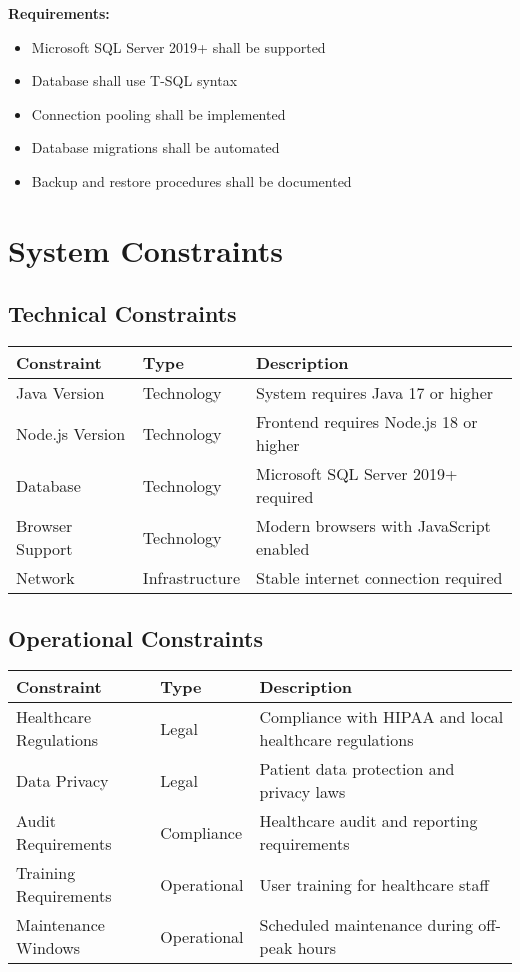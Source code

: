 \documentclass[12pt,a4paper]{article}
\begin{document}
\textbf{Requirements:}
\begin{itemize}
    \item Microsoft SQL Server 2019+ shall be supported
    \item Database shall use T-SQL syntax
    \item Connection pooling shall be implemented
    \item Database migrations shall be automated
    \item Backup and restore procedures shall be documented
\end{itemize}

\section{System Constraints}

\subsection{Technical Constraints}

\begin{longtable}{|p{3cm}|p{3cm}|p{8cm}|}
\hline
\textbf{Constraint} & \textbf{Type} & \textbf{Description} \\
\hline
Java Version & Technology & System requires Java 17 or higher \\
\hline
Node.js Version & Technology & Frontend requires Node.js 18 or higher \\
\hline
Database & Technology & Microsoft SQL Server 2019+ required \\
\hline
Browser Support & Technology & Modern browsers with JavaScript enabled \\
\hline
Network & Infrastructure & Stable internet connection required \\
\hline
\end{longtable}

\subsection{Operational Constraints}

\begin{longtable}{|p{3cm}|p{3cm}|p{8cm}|}
\hline
\textbf{Constraint} & \textbf{Type} & \textbf{Description} \\
\hline
Healthcare Regulations & Legal & Compliance with HIPAA and local healthcare regulations \\
\hline
Data Privacy & Legal & Patient data protection and privacy laws \\
\hline
Audit Requirements & Compliance & Healthcare audit and reporting requirements \\
\hline
Training Requirements & Operational & User training for healthcare staff \\
\hline
Maintenance Windows & Operational & Scheduled maintenance during off-peak hours \\
\hline
\end{longtable}
\end{document}
